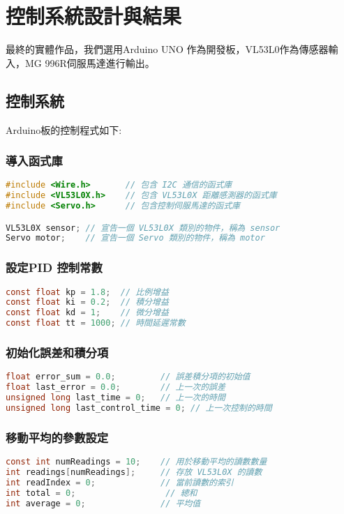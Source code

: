 \newpage
\section{控制系統設計與結果}
	最終的實體作品，我們選用Arduino UNO 作為開發板，VL53L0作為傳感器輸入，MG 996R伺服馬達進行輸出。


\subsection{控制系統}
Arduino板的控制程式如下:


\subsubsection{導入函式庫}
\begin{lstlisting}[language=C]
#include <Wire.h>       // 包含 I2C 通信的函式庫
#include <VL53L0X.h>    // 包含 VL53L0X 距離感測器的函式庫
#include <Servo.h>      // 包含控制伺服馬達的函式庫

VL53L0X sensor; // 宣告一個 VL53L0X 類別的物件，稱為 sensor
Servo motor;    // 宣告一個 Servo 類別的物件，稱為 motor
\end{lstlisting}


\subsubsection{設定PID 控制常數}
\begin{lstlisting}[language=C]
const float kp = 1.8;  // 比例增益
const float ki = 0.2;  // 積分增益
const float kd = 1;    // 微分增益
const float tt = 1000; // 時間延遲常數
\end{lstlisting}



\subsubsection{初始化誤差和積分項}
\begin{lstlisting}[language=C]
float error_sum = 0.0;         // 誤差積分項的初始值
float last_error = 0.0;        // 上一次的誤差
unsigned long last_time = 0;   // 上一次的時間
unsigned long last_control_time = 0; // 上一次控制的時間
\end{lstlisting}




\subsubsection{移動平均的參數設定}
\begin{lstlisting}[language=C]
const int numReadings = 10;    // 用於移動平均的讀數數量
int readings[numReadings];     // 存放 VL53L0X 的讀數
int readIndex = 0;             // 當前讀數的索引
int total = 0;         	    	// 總和
int average = 0;               // 平均值
\end{lstlisting}

